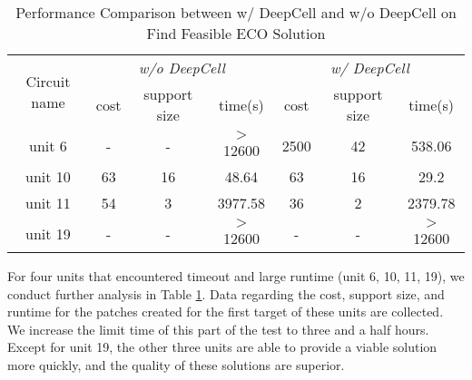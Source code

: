 \begin{table}[!t]
  \centering
  \caption{Performance Comparison between w/ DeepCell and w/o DeepCell on Find Feasible ECO Solution}
\vspace{-5pt}
    \linewidth
    \begin{tabular*}{\linewidth}{ccccccc}
    \toprule
    \multirow{2}[2]{*}{Circuit name} & \multicolumn{3}{c}{\textit{w/o DeepCell}} & \multicolumn{3}{c}{\textit{w/ DeepCell}} \\
          & cost  & support size & time(s) & cost  & support size & time(s) \\
    \midrule
    unit 6 & -     & -     & $>$12600 & 2500  & 42    & 538.06 \\
    unit 10 & 63    & 16    & 48.64 & 63    & 16    & 29.2 \\
    unit 11 & 54    & 3     & 3977.58 & 36    & 2     & 2379.78 \\
    unit 19 & -     & -     & $>$12600 & -     & -     & $>$12600 \\
    \bottomrule
    \end{tabular*}%
\vspace{-15pt}
  \label{compare in large unit}%
\end{table}%


For four units that encountered timeout and large runtime (unit 6, 10, 11, 19), we conduct further analysis in Table \ref{compare in large unit}. Data regarding the cost, support size, and runtime for the patches created for the first target of these units are collected. We increase the limit time of this part of the test to three and a half hours. Except for unit 19, the other three units are able to provide a viable solution more quickly, and the quality of these solutions are superior.


